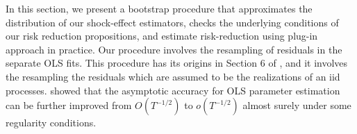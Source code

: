 \documentclass[11pt]{article}
\theoremstyle{definition}
\begin{document}
In this section, we present a bootstrap procedure that approximates the distribution of our shock-effect estimators, checks the underlying conditions of our risk reduction propositions, and estimate risk-reduction using plug-in approach in practice. Our procedure involves the resampling of residuals in the separate OLS fits. This procedure has its origins in Section 6 of \citet{efron1986bootstrap}, and it involves the resampling the residuals which are assumed to be the realizations of an iid processes.
\citet{bose1988edgeworth} showed that the asymptotic accuracy for OLS parameter estimation can be further improved from $O(T^{-1/2})$ to $o(T^{-1/2})$ almost surely under some regularity conditions.
\end{document}
